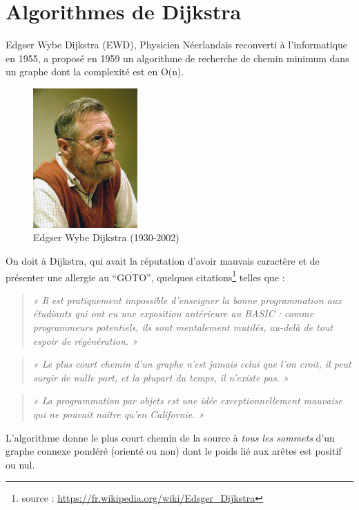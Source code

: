 \section{Algorithmes de Dijkstra}
Edgser Wybe Dijkstra (EWD), Physicien Néerlandais reconverti à l'informatique en 1955, a proposé en 1959 un algorithme de recherche de chemin minimum 
dans un graphe  dont  la complexité est en O(n). 

\begin{figure}[htp]
  \centering
  \includegraphics[width=4cm]{images/Edsger_Wybe_Dijkstra}
  \caption{Edgser Wybe Dijkstra (1930-2002)}
  \label{fig:une-autre-image}
\end{figure}

On doit à Dijkstra, qui avait la réputation d'avoir mauvais caractère et de présenter une allergie au ``GOTO'',
quelques citations\footnote{source : \url{https://fr.wikipedia.org/wiki/Edsger_Dijkstra}} telles que :


\begin{quote}
\textit{« Il est pratiquement impossible d'enseigner la bonne programmation aux étudiants 
qui ont eu une exposition antérieure au BASIC : comme programmeurs potentiels, 
ils sont mentalement mutilés, au-delà de tout espoir de régénération. »}
\end{quote}

\begin{quote}
\textit{« Le plus court chemin d'un graphe n'est jamais celui que l'on croit, 
il peut surgir de nulle part, et la plupart du temps, il n'existe pas. »}
\end{quote}

\begin{quote}
\textit{« La programmation par objets est une idée exceptionnellement mauvaise qui ne pouvait naître qu'en Californie. »}
\end{quote}


L'algorithme donne le plus court chemin de la source à \textit{tous les sommets} d'un graphe 
connexe pondéré (orienté ou non) dont le poids lié aux arêtes est positif ou nul.



